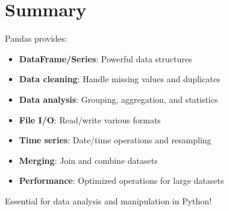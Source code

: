 \documentclass[12pt,a4paper]{article}
\begin{document}
\section{Summary}

Pandas provides:
\begin{itemize}
    \item \textbf{DataFrame/Series}: Powerful data structures
    \item \textbf{Data cleaning}: Handle missing values and duplicates
    \item \textbf{Data analysis}: Grouping, aggregation, and statistics
    \item \textbf{File I/O}: Read/write various formats
    \item \textbf{Time series}: Date/time operations and resampling
    \item \textbf{Merging}: Join and combine datasets
    \item \textbf{Performance}: Optimized operations for large datasets
\end{itemize}

Essential for data analysis and manipulation in Python!
\end{document}
